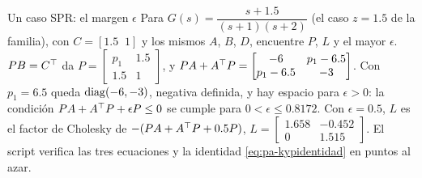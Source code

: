 \begin{ejemplo}[label=ej:pa-kypspr]{Un caso SPR: el margen $\epsilon$}
Para $G(s)=\dfrac{s+1.5}{(s+1)(s+2)}$ (el caso $z=1.5$ de la familia), con $C=[1.5\;\;1]$ y los mismos $A$, $B$, $D$, encuentre $P$, $L$ y el mayor $\epsilon$.
\solucion $PB=C^{\top}$ da $P=\begin{bmatrix}p_1&1.5\\1.5&1\end{bmatrix}$, y $PA+A^{\top} P=\begin{bmatrix}-6&p_1-6.5\\p_1-6.5&-3\end{bmatrix}$. Con $p_1=6.5$ queda $\operatorname{diag}(-6,-3)$, negativa definida, y hay espacio para $\epsilon>0$: la condición $PA+A^{\top} P+\epsilon P\le0$ se cumple para $0<\epsilon\le0.8172$. Con $\epsilon=0.5$, $L$ es el factor de Cholesky de $-(PA+A^{\top} P+0.5P)$, $L=\begin{bmatrix}1.658&-0.452\\0&1.515\end{bmatrix}$. El script  verifica las tres ecuaciones y la identidad \eqref{eq:pa-kypidentidad} en puntos al azar.
\end{ejemplo}

